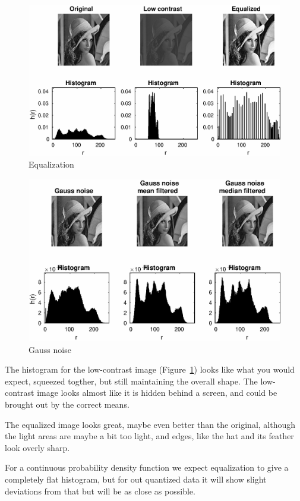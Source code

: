 \documentclass[a4paper]{article}
\begin{document}
\begin{figure}[!ht]
  \centerline{\includegraphics{images/2-1.eps}}
  \caption{Equalization}
  \label{fig:21}
\end{figure}
\begin{figure}[!ht]
  \centerline{\includegraphics{images/2-2_gauss.eps}}
  \caption{Gauss noise}
  \label{fig:22g}
\end{figure}

The histogram for the low-contrast image (Figure~\ref{fig:21}) looks like what you would expect, squeezed togther, but still maintaining the overall shape. The low-contrast image looks almost like it is hidden behind a screen, and could be brought out by the correct means.

The equalized image looks great, maybe even better than the original, although the light areas are maybe  a bit too light, and edges, like the hat and its feather look overly sharp.

For a continuous probability density function we expect equalization to give a completely flat histogram, but for out quantized data it will show slight deviations from that but will be as close as possible.
\end{document}
